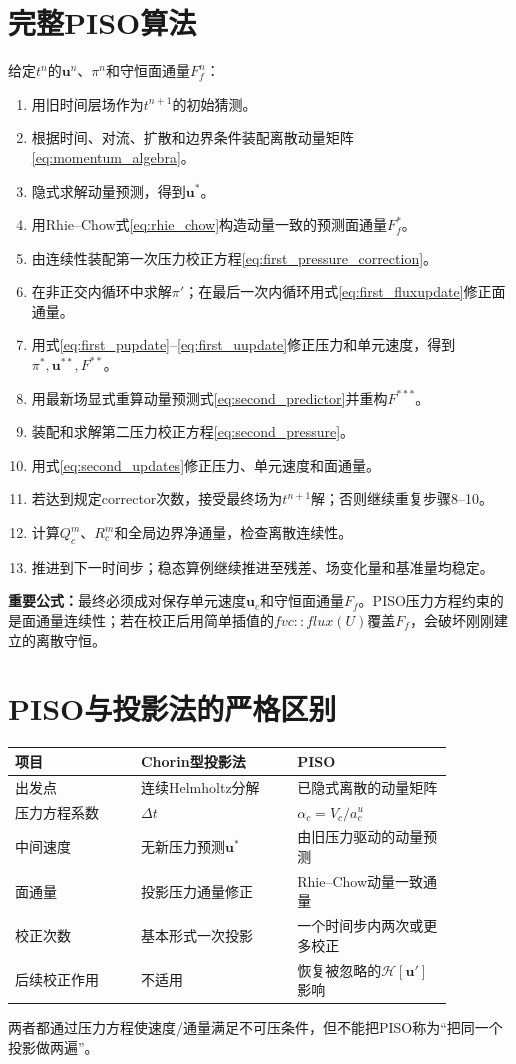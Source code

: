 \documentclass[UTF8,12pt,a4paper]{ctexart}
\numberwithin{equation}{section}
\newcommand{\dt}{\Delta t}
\newcommand{\keytitle}[1]{\par\smallskip\noindent\colorbox{keybg}{%
  \parbox{0.965\linewidth}{\color{keyblue}\textbf{重要公式：}#1}}\par\smallskip}
\begin{document}
\section{完整PISO算法}
给定$t^n$的$\bm u^n$、$\pi^n$和守恒面通量$F_f^n$：
\begin{enumerate}
  \item 用旧时间层场作为$t^{n+1}$的初始猜测。
  \item 根据时间、对流、扩散和边界条件装配离散动量矩阵\eqref{eq:momentum_algebra}。
  \item 隐式求解动量预测，得到$\bm u^*$。
  \item 用Rhie--Chow式\eqref{eq:rhie_chow}构造动量一致的预测面通量$F_f^*$。
  \item 由连续性装配第一次压力校正方程\eqref{eq:first_pressure_correction}。
  \item 在非正交内循环中求解$\pi'$；在最后一次内循环用式\eqref{eq:first_fluxupdate}修正面通量。
  \item 用式\eqref{eq:first_pupdate}--\eqref{eq:first_uupdate}修正压力和单元速度，得到$\pi^*,\bm u^{**},F^{**}$。
  \item 用最新场显式重算动量预测式\eqref{eq:second_predictor}并重构$F^{***}$。
  \item 装配和求解第二压力校正方程\eqref{eq:second_pressure}。
  \item 用式\eqref{eq:second_updates}修正压力、单元速度和面通量。
  \item 若达到规定corrector次数，接受最终场为$t^{n+1}$解；否则继续重复步骤8--10。
  \item 计算$Q_c^m$、$R_c^m$和全局边界净通量，检查离散连续性。
  \item 推进到下一时间步；稳态算例继续推进至残差、场变化量和基准量均稳定。
\end{enumerate}

\keytitle{最终必须成对保存单元速度$\bm u_c$和守恒面通量$F_f$。PISO压力方程约束的是面通量连续性；若在校正后用简单插值的$fvc::flux(U)$覆盖$F_f$，会破坏刚刚建立的离散守恒。}

\section{PISO与投影法的严格区别}
\begin{longtable}{p{0.25\linewidth}p{0.31\linewidth}p{0.31\linewidth}}
\toprule
项目 & Chorin型投影法 & PISO\\
\midrule
出发点 & 连续Helmholtz分解 & 已隐式离散的动量矩阵\\
压力方程系数 & $\dt$ & $\alpha_c=V_c/a_c^u$\\
中间速度 & 无新压力预测$\bm u^*$ & 由旧压力驱动的动量预测\\
面通量 & 投影压力通量修正 & Rhie--Chow动量一致通量\\
校正次数 & 基本形式一次投影 & 一个时间步内两次或更多校正\\
后续校正作用 & 不适用 & 恢复被忽略的$\mathcal H[\bm u']$影响\\
\bottomrule
\end{longtable}
两者都通过压力方程使速度/通量满足不可压条件，但不能把PISO称为“把同一个投影做两遍”。
\end{document}
